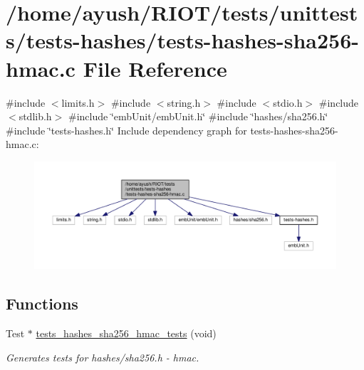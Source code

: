 \hypertarget{tests-hashes-sha256-hmac_8c}{}\section{/home/ayush/\+R\+I\+O\+T/tests/unittests/tests-\/hashes/tests-\/hashes-\/sha256-\/hmac.c File Reference}
\label{tests-hashes-sha256-hmac_8c}
{\ttfamily \#include $<$limits.\+h$>$}\newline
{\ttfamily \#include $<$string.\+h$>$}\newline
{\ttfamily \#include $<$stdio.\+h$>$}\newline
{\ttfamily \#include $<$stdlib.\+h$>$}\newline
{\ttfamily \#include \char`\"{}emb\+Unit/emb\+Unit.\+h\char`\"{}}\newline
{\ttfamily \#include \char`\"{}hashes/sha256.\+h\char`\"{}}\newline
{\ttfamily \#include \char`\"{}tests-\/hashes.\+h\char`\"{}}\newline
Include dependency graph for tests-\/hashes-\/sha256-\/hmac.c\+:
\nopagebreak
\begin{figure}[H]
\begin{center}
\leavevmode
\includegraphics[width=350pt]{tests-hashes-sha256-hmac_8c__incl}
\end{center}
\end{figure}
\subsection*{Functions}
\begin{DoxyCompactItemize}
\item 
Test $\ast$ \hyperlink{group__unittests_ga7a35b0db09ca01c1e2567b95bcd06227}{tests\+\_\+hashes\+\_\+sha256\+\_\+hmac\+\_\+tests} (void)
\begin{DoxyCompactList}\small\item\em Generates tests for hashes/sha256.\+h -\/ hmac. \end{DoxyCompactList}\end{DoxyCompactItemize}
